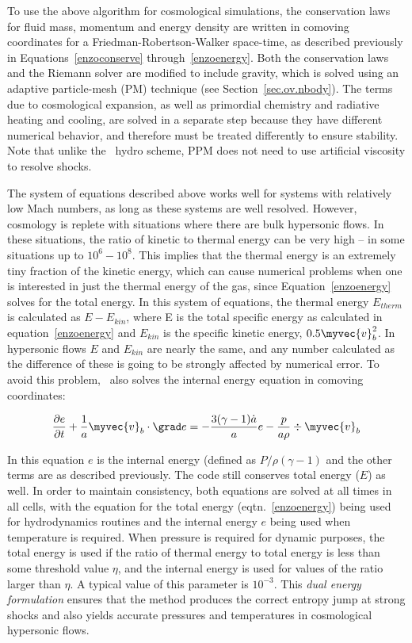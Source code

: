 To use the above algorithm for cosmological simulations, the
conservation laws for fluid mass, momentum and energy 
density are written in comoving coordinates for a
Friedman-Robertson-Walker space-time, as described previously 
in Equations~\ref{enzoconserve} 
through~\ref{enzoenergy}.  Both the conservation laws and
the Riemann solver are modified to include gravity, which is solved
using an adaptive particle-mesh (PM) technique (see Section~\ref{sec.ov.nbody}).  
The terms due to cosmological expansion, as well as primordial chemistry and
radiative heating and cooling, are solved in a separate step because they have
different numerical behavior, and therefore must be treated differently to ensure
stability.  Note that unlike the \zeus\ hydro scheme, PPM does not need to use 
artificial viscosity to resolve shocks.

The system of equations described above works well for systems with
relatively low Mach numbers, as long as these systems are well resolved.  
However, cosmology is replete with situations where there are bulk hypersonic
flows.  In these situations, the ratio of kinetic to thermal energy can be
very high -- in some situations up to $10^6 - 10^8$.  This implies that the
thermal energy is an extremely tiny fraction of the kinetic energy, which can 
cause numerical problems when one is interested in just the thermal energy of the gas, since
 Equation~\ref{enzoenergy} solves for the total energy.  In this system of
equations, the
 thermal energy $E_{therm}$ is calculated as $E - E_{kin}$, 
where E is the total specific energy as
calculated in equation~\ref{enzoenergy} and $E_{kin}$ is the specific kinetic energy,
$0.5 \myvec{v}_b^2$.  
In hypersonic flows $E$ and $E_{kin}$ are nearly the same, and any 
number calculated as 
the difference of these is going to be strongly affected by numerical error.  To 
avoid this problem, \enzo\ also solves the internal energy equation in
comoving coordinates:

\begin{equation}
\frac{\partial e}{\partial t} + \frac{1}{a} \myvec{v}_b \cdot \grad e = 
- \frac{3(\gamma-1)\dot{a}}{a}e - \frac{p}{a \rho} \div \myvec{v}_b
\label{enzointenergy}
\end{equation}

In this equation $e$ is the internal energy (defined as $P/\rho (\gamma-1)$ and the other terms are as described
previously.  The code still conserves total energy ($E$) as well.  In order
to maintain consistency, both equations are solved at all times in all cells,
with the equation for the total energy (eqtn.~\ref{enzoenergy}) being used
for hydrodynamics routines and the internal energy $e$ being used when 
temperature is required.  When pressure is required for dynamic purposes,
the total energy is used if the ratio of thermal energy to total energy
is less than some threshold value $\eta$, and the internal energy is used
for values of the ratio larger than $\eta$.  A typical value of this parameter
is $10^{-3}$.  This \emph{dual energy formulation} ensures that the
method produces the correct entropy jump at strong shocks and also
yields accurate pressures and temperatures in cosmological hypersonic
flows.



